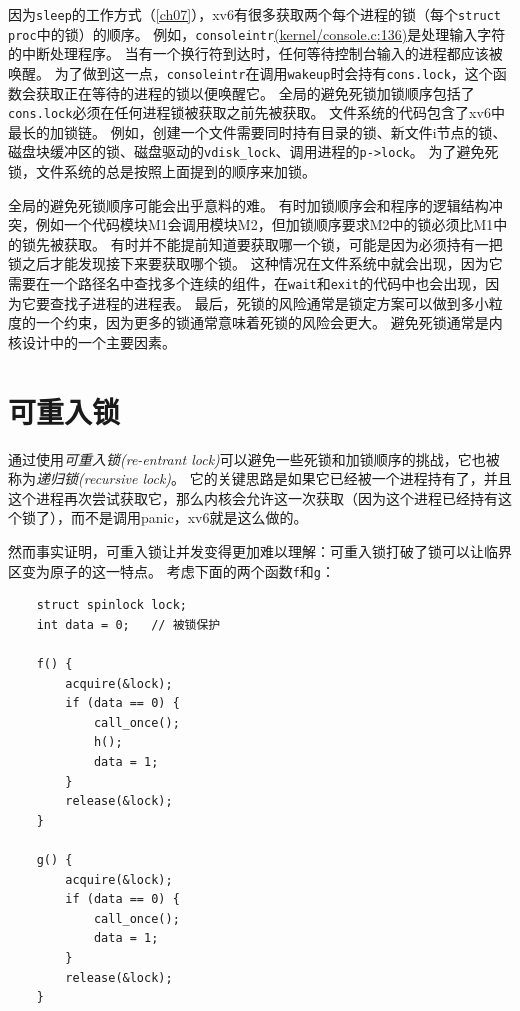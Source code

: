 因为\texttt{sleep}的工作方式（\autoref{ch07}），xv6有很多获取两个每个进程的锁（每个\texttt{struct proc}中的锁）的顺序。
例如，\texttt{consoleintr}\href{https://github.com/mit-pdos/xv6-riscv/blob/riscv//kernel/console.c#L136}{(kernel/console.c:136)}是处理输入字符的中断处理程序。
当有一个换行符到达时，任何等待控制台输入的进程都应该被唤醒。
为了做到这一点，\texttt{consoleintr}在调用\texttt{wakeup}时会持有\texttt{cons.lock}，这个函数会获取正在等待的进程的锁以便唤醒它。
全局的避免死锁加锁顺序包括了\texttt{cons.lock}必须在任何进程锁被获取之前先被获取。
文件系统的代码包含了xv6中最长的加锁链。
例如，创建一个文件需要同时持有目录的锁、新文件i节点的锁、磁盘块缓冲区的锁、磁盘驱动的\texttt{vdisk\_lock}、调用进程的\texttt{p->lock}。
为了避免死锁，文件系统的总是按照上面提到的顺序来加锁。

全局的避免死锁顺序可能会出乎意料的难。
有时加锁顺序会和程序的逻辑结构冲突，例如一个代码模块M1会调用模块M2，但加锁顺序要求M2中的锁必须比M1中的锁先被获取。
有时并不能提前知道要获取哪一个锁，可能是因为必须持有一把锁之后才能发现接下来要获取哪个锁。
这种情况在文件系统中就会出现，因为它需要在一个路径名中查找多个连续的组件，在\texttt{wait}和\texttt{exit}的代码中也会出现，因为它要查找子进程的进程表。
最后，死锁的风险通常是锁定方案可以做到多小粒度的一个约束，因为更多的锁通常意味着死锁的风险会更大。
避免死锁通常是内核设计中的一个主要因素。

\section{可重入锁}
通过使用\emph{可重入锁(re-entrant lock)}可以避免一些死锁和加锁顺序的挑战，它也被称为\emph{递归锁(recursive lock)}。
它的关键思路是如果它已经被一个进程持有了，并且这个进程再次尝试获取它，那么内核会允许这一次获取（因为这个进程已经持有这个锁了），而不是调用panic，xv6就是这么做的。

然而事实证明，可重入锁让并发变得更加难以理解：可重入锁打破了锁可以让临界区变为原子的这一特点。
考虑下面的两个函数\texttt{f}和\texttt{g}：
\begin{lstlisting}
    struct spinlock lock;
    int data = 0;   // 被锁保护
    
    f() {
        acquire(&lock);
        if (data == 0) {
            call_once();
            h();
            data = 1;
        }
        release(&lock);
    }

    g() {
        acquire(&lock);
        if (data == 0) {
            call_once();
            data = 1;
        }
        release(&lock);
    }
\end{lstlisting}

